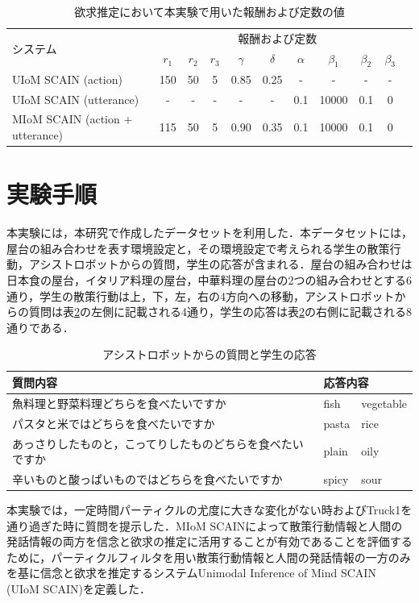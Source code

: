 \begin{table}[htb]
  \begin{center}
  \caption{欲求推定において本実験で用いた報酬および定数の値}
  \label{d_params}
  \begin{tabular}{lcccccccccc} \hline
    \multirow{2}{*}{システム}&\multicolumn{9}{c}{報酬および定数}\\\cline{2-10}
    & $r_1$& $r_2$&$r_3$&$\gamma$&$\delta$&$\alpha$&$\beta_1$&$\beta_2$&$\beta_3$\\ \hline
    UIoM SCAIN (action)&150&50&5&0.85&0.25&-&-&-&-\\
    UIoM SCAIN (utterance)&-&-&-&-&-&0.1&10000&0.1&0\\
    MIoM SCAIN (action + utterance)&115&50&5&0.90&0.35&0.1&10000&0.1&0\\\hline
  \end{tabular}
\end{center}
\end{table}

\section{実験手順}

\par
本実験には，本研究で作成したデータセットを利用した．本データセットには，屋台の組み合わせを表す環境設定と，その環境設定で考えられる学生の散策行動，アシストロボットからの質問，学生の応答が含まれる．屋台の組み合わせは日本食の屋台，イタリア料理の屋台，中華料理の屋台の2つの組み合わせとする6通り，学生の散策行動は上，下，左，右の4方向への移動，アシストロボットからの質問は表\ref{tab:q_a}の左側に記載される4通り，学生の応答は表\ref{tab:q_a}の右側に記載される8通りである．
\begin{table}[htb]
  \begin{center}
  \caption{アシストロボットからの質問と学生の応答}
  \label{tab:q_a}
  \begin{tabular}{lll} \hline
    質問内容&\multicolumn{2}{l}{応答内容}\\\hline
    魚料理と野菜料理どちらを食べたいですか&fish&vegetable\\
    パスタと米ではどちらを食べたいですか&pasta&rice\\
    あっさりしたものと，こってりしたものどちらを食べたいですか&plain&oily\\
    辛いものと酸っぱいものではどちらを食べたいですか&spicy&sour\\\hline
  \end{tabular}
\end{center}
\end{table}
本実験では，一定時間パーティクルの尤度に大きな変化がない時およびTruck1を通り過ぎた時に質問を提示した．MIoM SCAINによって散策行動情報と人間の発話情報の両方を信念と欲求の推定に活用することが有効であることを評価するために，パーティクルフィルタを用い散策行動情報と人間の発話情報の一方のみを基に信念と欲求を推定するシステムUnimodal Inference of Mind SCAIN (UIoM SCAIN)を定義した．


